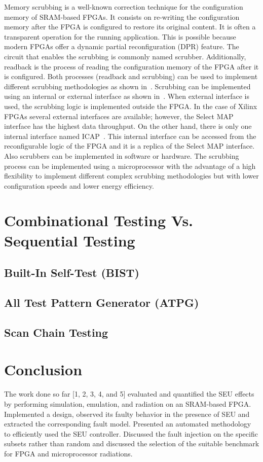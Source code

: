 Memory scrubbing is a well-known correction technique for the configuration memory of SRAM-based FPGAs. It consists on re-writing the configuration memory after the FPGA is configured to restore its original content. It is often a transparent operation for the running application. This is possible because modern FPGAs offer a dynamic partial reconfiguration (DPR) feature. The circuit that enables the scrubbing is commonly named scrubber. Additionally, readback is the process of reading the configuration memory of the FPGA after it is configured. Both processes (readback and scrubbing) can be used to implement different scrubbing methodologies as shown in~\cite{herrera2013design}. Scrubbing can be implemented using an internal or external interface as shown in~\cite{berg2008effectiveness}. When external interface is used, the scrubbing logic is implemented outside the FPGA. In the case of Xilinx FPGAs several external interfaces are available; however, the Select MAP interface has the highest data throughput. On the other hand, there is only one internal interface named ICAP~\cite{xilinx}. This internal interface can be accessed from the reconfigurable logic of the FPGA and it is a replica of the Select MAP interface. Also scrubbers can be implemented in software or hardware. The scrubbing process can be implemented using a microprocessor with the advantage of a high flexibility to implement different complex scrubbing methodologies but with lower configuration speeds and lower energy efficiency.

\section{Combinational Testing Vs. Sequential Testing}

\subsection{Built-In Self-Test (BIST)}
\subsection{All Test Pattern Generator (ATPG)}
\subsection{Scan Chain Testing}

\section{Conclusion}
The work done so far [1, 2, 3, 4, and 5] evaluated and quantified the SEU effects by performing simulation, emulation, and radiation on an SRAM-based FPGA. Implemented a design, observed its faulty behavior in the presence of SEU and extracted the corresponding fault model. Presented an automated methodology to efficiently used the SEU controller. Discussed the fault injection on the specific subsets rather than random and discussed the selection of the suitable benchmark for FPGA and microprocessor radiations. 




